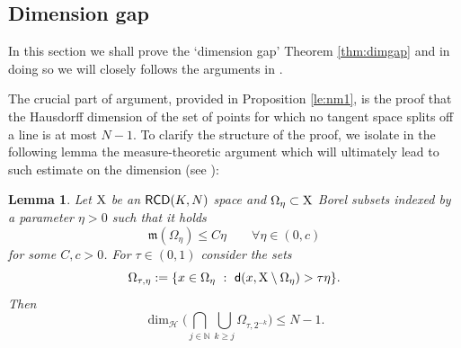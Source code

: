 \documentclass[reqno,11pt]{article}
\numberwithin{equation}{section}
\newcommand{\N}{\mathbb{N}}
\newcommand{\mm}{{\mbox{\boldmath$m$}}}
\newcommand{\sfd}{{\sf d}}
\renewcommand{\mm}{\mathfrak m}                                %
\newtheorem{lemma}[theorem]{Lemma}
\newcommand{\X}{{\rm X}}
\newcommand{\RCD}{{\sf RCD}}
\newcommand{\HH}{{\mathcal H}}
\begin{document}
\subsection{Dimension gap}
In this section we shall prove the `dimension gap' Theorem \ref{thm:dimgap} and in doing so we will closely follows the arguments in \cite[Section 3]{Cheeger-Colding97I}. 

The crucial part of argument, provided in  Proposition \ref{le:nm1}, is the proof that the Hausdorff dimension of the set of points for which no tangent space splits off a line is at most $N-1$. To clarify the structure of the proof, we isolate in the following lemma the measure-theoretic argument which will ultimately lead to  such estimate on the dimension (see \cite[Proposition 3.2]{Cheeger-Colding97I}):
\begin{lemma}\label{le:figo}
Let $\X$ be an $\RCD(K,N)$ space and $\Omega_\eta\subset \X$  Borel subsets indexed by a parameter $\eta> 0$ such that  it holds
\begin{equation}
\label{eq:hypmes}
\mm(\Omega_\eta)\leq C\eta\qquad \forall\eta\in(0,c)
\end{equation}
for some $C,c>0$. For $\tau\in(0,1)$  consider the sets
\begin{equation}
\label{eq:omegatau}
\Omega_{\tau,\eta}:=\{x\in\Omega_\eta\ :\ \sfd(x,\X\setminus\Omega_\eta)>\tau\eta\}.
\end{equation}
Then
\[
\dim_\HH\Big(\bigcap_{j\in\N}\bigcup_{k\geq j}\Omega_{\tau,2^{-k}}\Big)\leq N-1.
\]
\end{lemma}
\end{document}
